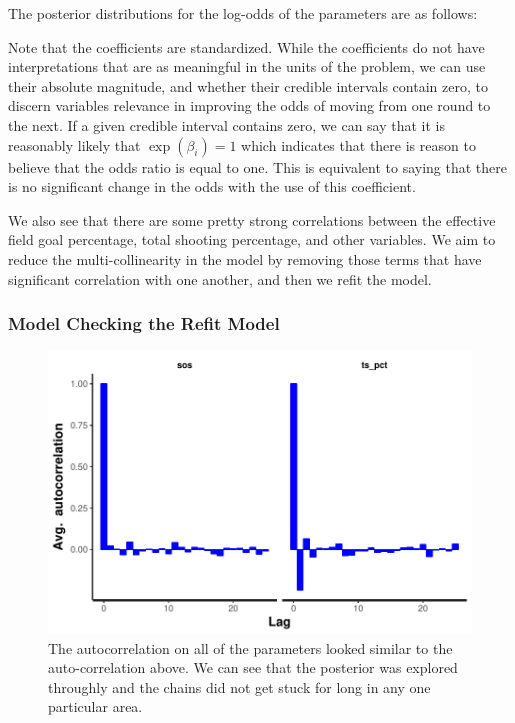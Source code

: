 \documentclass[10pt,a4paper, hidelinks]{article} %
\begin{document}
The posterior distributions for the log-odds of the parameters are as follows:

\begin{figure}[H]
	\centering
	
\end{figure}

Note that the coefficients are standardized. While the coefficients do not have interpretations that are as meaningful in the units of the problem, we can use their absolute magnitude, and whether their credible intervals contain zero, to discern variables relevance in improving the odds of moving from one round to the next. If a given credible interval contains zero, we can say that it is reasonably likely that $\exp(\beta_i) = 1$ which indicates that there is reason to believe that the odds ratio is equal to one. This is equivalent to saying that there is no significant change in the odds with the use of this coefficient.

We also see that there are some pretty strong correlations between the effective field goal percentage, total shooting percentage, and other variables. We aim to reduce the multi-collinearity in the model by removing those terms that have significant correlation with one another, and then we refit the model. 

\subsubsection{Model Checking the Refit Model}
\begin{figure}[H]
	\centering
	\includegraphics[width=.6\linewidth]{../fig/polr_autocorr}
	\caption{The autocorrelation on all of the parameters looked similar to the auto-correlation above. We can see that the posterior was explored throughly and the chains did not get stuck for long in any one particular area. }
	\label{fig:polr_autocorrelation}
\end{figure}
\end{document}
